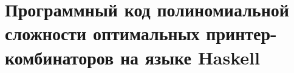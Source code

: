 \appendix

\section{Программный код полиномиальной сложности оптимальных принтер-комбинаторов на языке Haskell}
\label{app:1}


